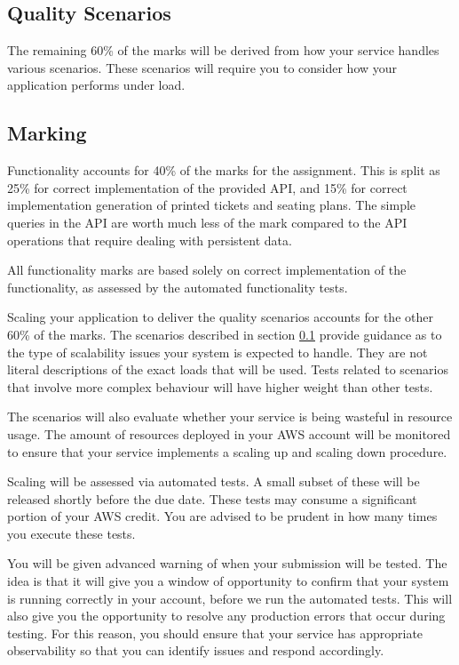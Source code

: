 \documentclass{csse4400}
\begin{document}
\subsection{Quality Scenarios}\label{sec:scenarios}
The remaining 60\% of the marks will be derived from how your service handles various scenarios.
These scenarios will require you to consider how your application performs under load.


\subsection{Marking}
Functionality accounts for 40\% of the marks for the assignment.
This is split as 25\% for correct implementation of the provided API,
and 15\% for correct implementation generation of printed tickets and seating plans.
The simple queries in the API are worth much less of the mark compared to the API operations that require dealing with persistent data.

All functionality marks are based solely on correct implementation of the functionality,
as assessed by the automated functionality tests.

Scaling your application to deliver the quality scenarios accounts for the other 60\% of the marks.
The scenarios described in section \ref{sec:scenarios} provide guidance as to the type of scalability issues your system is expected to handle.
They are not literal descriptions of the exact loads that will be used.
Tests related to scenarios that involve more complex behaviour will have higher weight than other tests.

The scenarios will also evaluate whether your service is being wasteful in resource usage.
The amount of resources deployed in your AWS account will be monitored to ensure that your service implements a scaling up and scaling down procedure.

Scaling will be assessed via automated tests.
A small subset of these will be released shortly before the due date.
These tests may consume a significant portion of your AWS credit.
You are advised to be prudent in how many times you execute these tests.

You will be given advanced warning of when your submission will be tested.
The idea is that it will give you a window of opportunity to confirm that your system is running correctly in your account,
before we run the automated tests.
This will also give you the opportunity to resolve any production errors that occur during testing.
For this reason,
you should ensure that your service has appropriate observability so that you can identify issues and respond accordingly.
\end{document}
